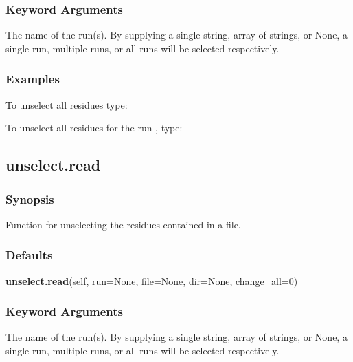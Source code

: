 \subsubsection{Keyword Arguments}

  The name of the run(s).  By supplying a single string, array of strings, or None, a single run, multiple runs, or all runs will be selected respectively. 




\subsubsection{Examples}

To unselect all residues type:



To unselect all residues for the run , type:






\newpage

\subsection{unselect.read}


\subsubsection{Synopsis}

Function for unselecting the residues contained in a file.



\subsubsection{Defaults}

\textsf{\textbf{unselect.read}(self, run=None, file=None, dir=None, change\_all=0)}


\subsubsection{Keyword Arguments}

  The name of the run(s).  By supplying a single string, array of strings, or None, a single run, multiple runs, or all runs will be selected respectively. 

